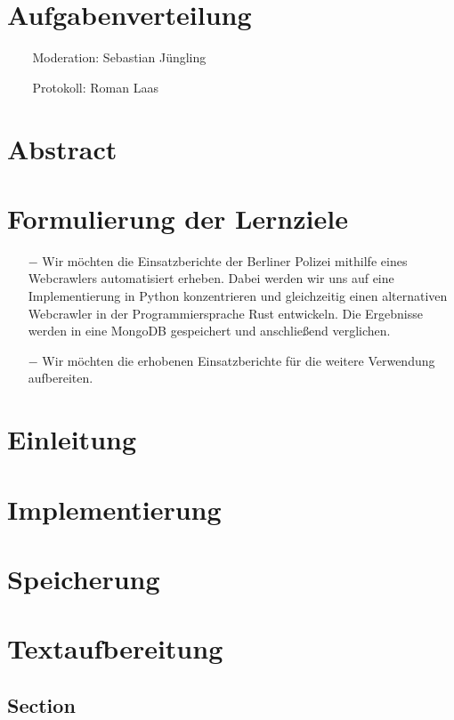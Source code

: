 \documentclass[chapterprefix=false, 12pt, a4paper, oneside, parskip=half, listof=totoc, bibliography=totoc, numbers=noendperiod]{scrbook}
\begin{document}
    \tableofcontents

    \chapter{Aufgabenverteilung}
\begin{itemize}
	\item[$$] Moderation: Sebastian Jüngling
	\item[$$] Protokoll: Roman Laas
\end{itemize}

    \chapter{Abstract}

    \chapter{Formulierung der Lernziele}

\begin{itemize}
\item[$-$] Wir möchten die Einsatzberichte der Berliner Polizei mithilfe eines Webcrawlers automatisiert erheben. Dabei werden wir uns auf eine Implementierung in Python konzentrieren und gleichzeitig einen alternativen Webcrawler in der Programmiersprache Rust entwickeln. Die Ergebnisse werden in eine MongoDB gespeichert und anschließend verglichen.
\item[$-$] Wir möchten die erhobenen Einsatzberichte für die weitere Verwendung aufbereiten.
\end{itemize}

	\chapter{Einleitung}
	\chapter{Implementierung}
	\chapter{Speicherung}
	\chapter{Textaufbereitung}
	\section{Section}
\end{document}
